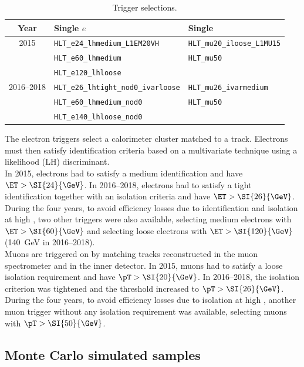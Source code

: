 \begin{table}[htbp]
	\centering
	\footnotesize
	\begin{tabular}{cll}
		\toprule
		Year & \multicolumn{1}{l}{Single $e$} & \multicolumn{1}{l}{Single \Pgm} \\
		\midrule
		2015 & \texttt{HLT\_e24\_lhmedium\_L1EM20VH} & \texttt{HLT\_mu20\_iloose\_L1MU15} \\
		& \texttt{HLT\_e60\_lhmedium} & \texttt{HLT\_mu50} \\
		& \texttt{HLT\_e120\_lhloose} & \\
		\midrule
		2016--2018 & \texttt{HLT\_e26\_lhtight\_nod0\_ivarloose} & \texttt{HLT\_mu26\_ivarmedium} \\
		& \texttt{HLT\_e60\_lhmedium\_nod0} & \texttt{HLT\_mu50} \\
		& \texttt{HLT\_e140\_lhloose\_nod0} & \\
		\bottomrule
	\end{tabular}
	\caption{Trigger selections.}%
	\label{tab:samples:trig}
\end{table}

\noindent The electron triggers select a calorimeter cluster matched to a track.
Electrons must then satisfy identification criteria based on a multivariate technique using a likelihood (LH) discriminant.\\
In 2015, electrons had to satisfy a medium identification and have $\ET > \SI{24}{\GeV}$.
In 2016--2018, electrons had to satisfy a tight identification
together with an isolation criteria and have $\ET > \SI{26}{\GeV}$.
During the four years, to avoid efficiency losses due to identification and isolation at high \pT, 
two other triggers were also available,
selecting medium electrons with $\ET > \SI{60}{\GeV}$
and selecting loose electrons with $\ET > \SI{120}{\GeV}$ (\SI{140}{\GeV} in 2016--2018).\\
Muons are triggered on by matching tracks reconstructed in the muon spectrometer and in the inner detector.
In 2015, muons had to satisfy a loose isolation requirement and have $\pT >\SI{20}{\GeV}$. In 2016--2018, the isolation criterion was tightened and the threshold increased to $\pT >\SI{26}{\GeV}$.
During the four years, to avoid efficiency losses due to isolation at high \pT,
another muon trigger without any isolation requirement was available,
selecting muons with $\pT > \SI{50}{\GeV}$. 

\subsection{Monte Carlo simulated samples}%
\label{sec:samples:mc}

